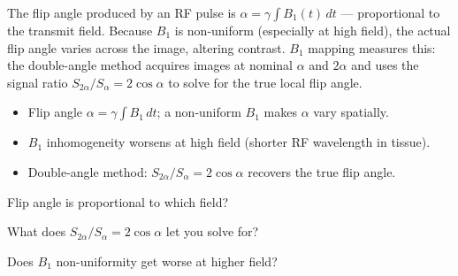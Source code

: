\begin{workedexample}
The flip angle produced by an RF pulse is $\alpha = \gamma\int B_1(t)\,dt$
--- proportional to the transmit field. Because $B_1$ is non-uniform (especially at
high field), the actual flip angle varies across the image, altering contrast.
$B_1$ mapping measures this: the double-angle method acquires images at nominal
$\alpha$ and $2\alpha$ and uses the signal ratio $S_{2\alpha}/S_\alpha = 2\cos\alpha$
to solve for the true local flip angle.
\end{workedexample}

\begin{keytakeaways}
\begin{itemize}[leftmargin=1.4em,itemsep=2pt]
\item Flip angle $\alpha = \gamma\int B_1\,dt$; a non-uniform $B_1$ makes $\alpha$ vary spatially.
\item $B_1$ inhomogeneity worsens at high field (shorter RF wavelength in tissue).
\item Double-angle method: $S_{2\alpha}/S_\alpha = 2\cos\alpha$ recovers the true flip angle.
\end{itemize}
\end{keytakeaways}

\begin{exercises}
\item Flip angle is proportional to which field?
\item What does $S_{2\alpha}/S_\alpha = 2\cos\alpha$ let you solve for?
\item Does $B_1$ non-uniformity get worse at higher field?
\end{exercises}

